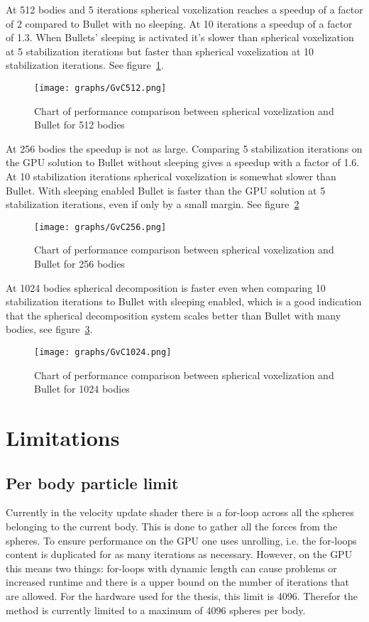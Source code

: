 At 512 bodies and 5 iterations spherical voxelization reaches a speedup of a factor of 2 compared to
Bullet with no sleeping. At 10 iterations a speedup of a factor of 1.3.
When Bullets' sleeping is activated it's slower than spherical voxelization at 5 stabilization iterations but faster than
spherical voxelization at 10 stabilization iterations. See figure~\ref{fig:GvC512}.

\begin{figure}[H]
  \centering
  \texttt{[image: graphs/GvC512.png]}
  \caption{Chart of performance comparison between spherical voxelization and Bullet for 512 bodies}
  \label{fig:GvC512}
\end{figure}

At 256 bodies the speedup is not as large. Comparing 5 stabilization iterations on the
GPU solution to Bullet without sleeping gives a speedup with a factor of 1.6.
At 10 stabilization iterations spherical voxelization is somewhat slower than Bullet.
With sleeping enabled Bullet is faster than the GPU solution at 5 stabilization iterations, even if
only by a small margin. See figure~\ref{fig:GvC256}

\begin{figure}[H]
  \centering
  \texttt{[image: graphs/GvC256.png]}
  \caption{Chart of performance comparison between spherical voxelization and Bullet for 256 bodies}
  \label{fig:GvC256}
\end{figure}

At 1024 bodies spherical decomposition is faster even when comparing 10 stabilization iterations
to Bullet with sleeping enabled, which is a good indication that the spherical decomposition system
scales better than Bullet with many bodies, see figure~\ref{fig:GvC1024}.

\begin{figure}[H]
  \centering
  \texttt{[image: graphs/GvC1024.png]}
  \caption{Chart of performance comparison between spherical voxelization and Bullet for 1024 bodies}
  \label{fig:GvC1024}
\end{figure}

\section{Limitations}
\subsection{Per body particle limit}
Currently in the velocity update shader there is a for-loop across all the spheres
belonging to the current body. This is done to gather all the forces from the spheres.
To ensure performance on the GPU one uses unrolling, i.e. the for-loops content is
duplicated for as many iterations as necessary. However, on the GPU this means two things:
for-loops with dynamic length can cause problems or increased runtime and there is a upper
bound on the number of iterations that are allowed. For the hardware used for the thesis,
this limit is 4096. Therefor the method is currently limited to a maximum of 4096
spheres per body.

